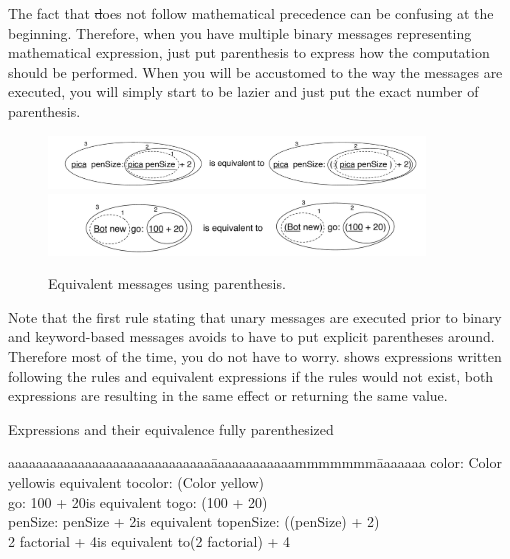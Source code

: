 
\begin{astuce}
The fact that \st does not follow mathematical precedence can be confusing at the beginning. Therefore, when you have multiple binary messages representing mathematical expression, just put parenthesis to express how the computation should be performed. When you will be accustomed to the way the messages are executed, you will simply start to be lazier and just put the exact number of parenthesis. 
\end{astuce}

\begin{figure}
\begin{center}\includegraphics[width=10cm]{uKeyUnBinPar}
\includegraphics[width=10cm]{uunKeyBinPar}\end{center}
\caption{Equivalent messages using parenthesis. \label{fig:uKeyUnBinPar}}
\end{figure}


Note that the first rule stating that unary messages are executed prior to binary and keyword-based messages avoids to have to put explicit parentheses around. Therefore most of the time, you do not have to worry.  shows expressions written following the rules and equivalent expressions if the rules would not exist, both expressions are resulting in the same effect or returning  the same value. 

\begin{scriptwithtitle}{Expressions and their equivalence fully parenthesized}\label{scr:expressions}
\begin{tabbing}
aaaaaaaaaaaaaaaaaaaaaaaaaaaaa\=aaaaaaaaaaaammmmmmm\=aaaaaaa\kill
\caro color: Color yellow\>is equivalent to\>\caro color: (Color yellow)\\
\caro go: 100 + 20\>is equivalent to\>\caro go: (100 + 20) \\
\caro penSize: \caro penSize + 2\>is equivalent to\>\caro penSize: ((\caro penSize) + 2)\\
2 factorial + 4\>is equivalent to\>(2 factorial) + 4
\end{tabbing}
\end{scriptwithtitle}


